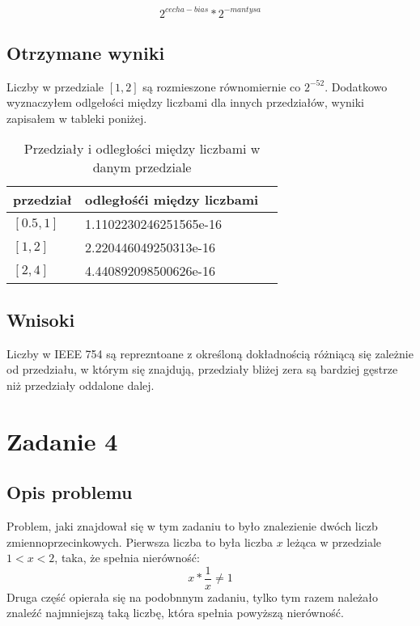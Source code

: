 \documentclass{article}
\begin{document}
$$\left. 2^{cecha-bias}*2^{-mantysa}\right.$$

\subsection{Otrzymane wyniki}

Liczby w przedziale \([1,2]\) są rozmieszone równomiernie co \(2^{-52}\). Dodatkowo wyznaczyłem odlgełości między liczbami dla innych przedziałów, wyniki zapisałem w tableki poniżej.

\begin{table}[h!]
    \centering
    \begin{tabular}{|l|l|l|}
     \hline
     przedział & odległośći między liczbami  \\
     \hline
     \([0.5, 1]\) & 1.1102230246251565e-16  \\ 
     \([1, 2]\) & 2.220446049250313e-16  \\
     \([2,4]\) & 4.440892098500626e-16  \\
     \hline
    \end{tabular}
    \caption{Przedziały i odległości między liczbami w danym przedziale}
    \label{table:7}
\end{table}

\subsection{Wnisoki}

Liczby w IEEE 754 są reprezntoane z określoną dokładnością różniącą się zależnie od przedziału, w którym się znajdują, przedziały bliżej zera są bardziej gęstrze niż przedziały oddalone dalej.

\section{Zadanie 4}

\subsection{Opis problemu}

Problem, jaki znajdował się w tym zadaniu to było znalezienie dwóch liczb zmiennoprzecinkowych. Pierwsza liczba to była liczba \(x\) leżąca w przedziale \(1 < x < 2\), taka, że spełnia nierówność: $$\left.  x * \frac{1}{x} \neq 1\right.$$ Druga część opierała się na podobnnym zadaniu, tylko tym razem należało znaleźć najmniejszą taką liczbę, która spełnia powyższą nierówność.
\end{document}
